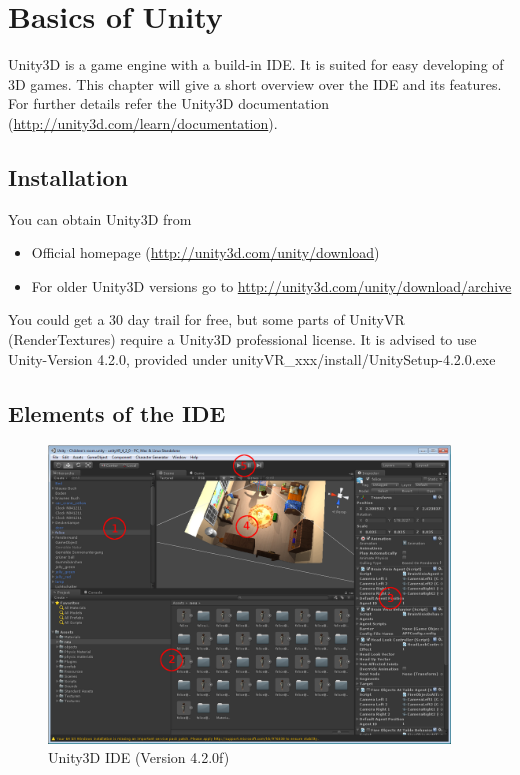 \documentclass[10pt,final]{scrreprt}
\begin{document}
\chapter{Basics of Unity}
\label{basicsofunity}



Unity3D is a game engine with a build-in IDE. It is suited for easy developing of 3D games. This chapter will give a short overview over  the IDE and its features. For further details refer the Unity3D documentation ({\url{http://unity3d.com/learn/documentation}}).

\section{Installation}
\label{Installationofunity}

You can obtain Unity3D from 
\begin{itemize}
\item  Official homepage (\url{http://unity3d.com/unity/download})
\item For older Unity3D versions go to \url{http://unity3d.com/unity/download/archive}
\end{itemize}

You could get a 30 day trail for free, but some parts of UnityVR (RenderTextures) require a Unity3D professional license.  It is advised to use Unity-Version 4.2.0, provided under unityVR\_xxx/install/UnitySetup-4.2.0.exe

\section{Elements of the IDE}
\label{elementsofIDE}

\begin{figure}[h]
\begin{center}
\includegraphics[width=0.95\textwidth]{images/unitywindow2.png}
\end{center}
\caption{Unity3D IDE (Version 4.2.0f)}
\label{unitywindow}
\end{figure}
\end{document}
